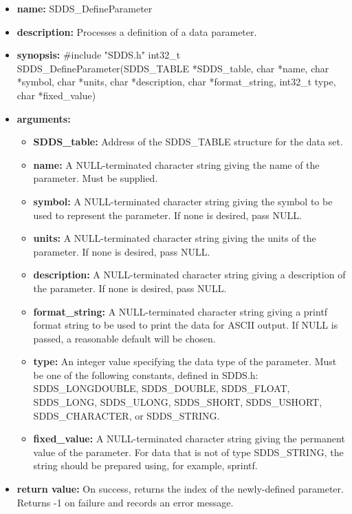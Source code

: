 \documentclass[11pt]{article}
\begin{document}
\begin{itemize}
\item {\bf name:}\newline
SDDS\_DefineParameter
\item {\bf description:}\newline
Processes a definition of a data parameter.
\item {\bf synopsis:} \#include "SDDS.h"\newline
int32\_t SDDS\_DefineParameter(SDDS\_TABLE *SDDS\_table, char *name, char *symbol, char *units, char *description, char *format\_string, int32\_t type, char *fixed\_value)
\item {\bf arguments:}
\begin{itemize}
\item {\bf SDDS\_table:} Address of the SDDS\_TABLE structure for the data set.
\item {\bf name:} A NULL-terminated character string giving the name of the parameter. Must be supplied.
\item {\bf symbol:} A NULL-terminated character string giving the symbol to be used to represent the parameter. If none is desired, pass NULL.
\item {\bf units:} A NULL-terminated character string giving the units of the parameter. If none is desired, pass NULL.
\item {\bf description:} A NULL-terminated character string giving a description of the parameter. If none is desired, pass NULL.
\item {\bf format\_string:} A NULL-terminated character string giving a  printf format string to be used to print the data for ASCII output. If NULL is passed, a reasonable default will be chosen.
\item {\bf type:} An integer value specifying the data type of the parameter. Must be one of the following constants, defined in  SDDS.h: SDDS\_LONGDOUBLE, SDDS\_DOUBLE, SDDS\_FLOAT, SDDS\_LONG, SDDS\_ULONG, SDDS\_SHORT, SDDS\_USHORT, SDDS\_CHARACTER, or SDDS\_STRING.
\item {\bf fixed\_value:} A NULL-terminated character string giving the permanent value of the parameter. For data that is not of type SDDS\_STRING, the string should be prepared using, for example, sprintf.
\end{itemize}
\item {\bf return value:}\newline
On success, returns the index of the newly-defined parameter. Returns -1 on failure and records an error message.

\end{itemize}
\end{document}
